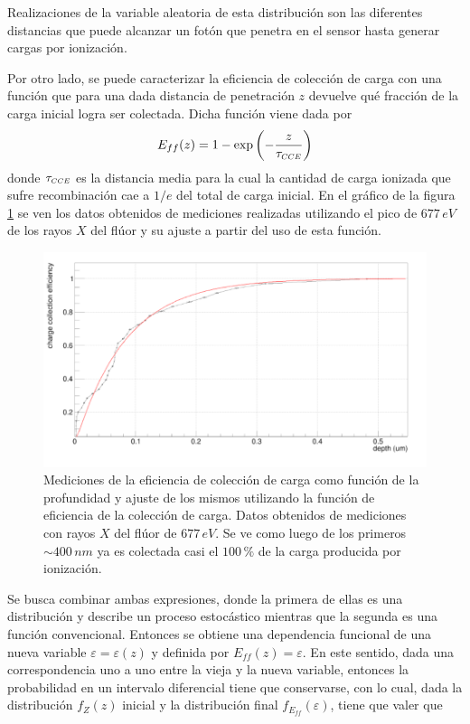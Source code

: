 Realizaciones de la variable aleatoria de esta distribución son las diferentes distancias que puede alcanzar un fotón que penetra en el sensor hasta generar cargas por ionización.

Por otro lado, se puede caracterizar la eficiencia de colección de carga con una función que para una dada distancia de penetración $z$ devuelve qué fracción de la carga inicial logra ser colectada. Dicha función viene dada por
\begin{equation*}
    E_{ff}(z) = 1 - 
    \exp
    \left(
        -\frac{z}{\tau_{\scaleto{CCE}{4pt}}}
    \right)
\end{equation*}
donde $\tau_{\scaleto{CCE}{4pt}}$ es la distancia media para la cual la cantidad de carga ionizada que sufre recombinación cae a $1/e$ del total de carga inicial. En el gráfico de la figura \ref{fig:EficienciaCC} se ven los datos obtenidos de mediciones realizadas utilizando el pico de $677\,\si{eV}$ de los rayos $X$ del flúor y su ajuste a partir del uso de esta función.
\begin{figure}[H]
    \centering
        \includegraphics[scale=0.3]{pngs/CCE_plot.png}
    \caption{\footnotesize{Mediciones de la eficiencia de colección de carga como función de la profundidad y ajuste de los mismos utilizando la función de eficiencia de la colección de carga. Datos obtenidos de mediciones con rayos $X$ del flúor de $677\,\si{eV}$. Se ve como luego de los primeros $\sim 400\,\si{nm}$ ya es colectada casi el $100\,\%$ de la carga producida por ionización.}}
    \label{fig:EficienciaCC}
\end{figure}
Se busca combinar ambas expresiones, donde la primera de ellas es una distribución y describe un proceso estocástico mientras que la segunda es una función convencional. Entonces se obtiene una dependencia funcional de una nueva variable $\varepsilon = \varepsilon(z)$ y definida por $E_{ff}(z) = \varepsilon$. En este sentido, dada una correspondencia uno a uno entre la vieja y la nueva variable, entonces la probabilidad en un intervalo diferencial tiene que conservarse, con lo cual, dada la distribución $f_{Z}(z)$ inicial y la distribución final $f_{E_{ff}}(\varepsilon)$, tiene que valer que
